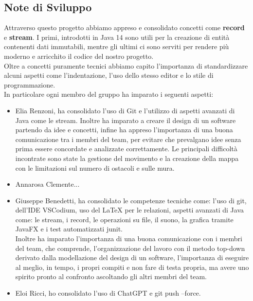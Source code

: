 \documentclass[12pt, letterpaper]{article}
\begin{document}
    \subsection{Note di Sviluppo}
        Attraverso questo progetto abbiamo appreso e consolidato concetti come \textbf{record} e \textbf{stream}. I primi, introdotti in Java 14 sono utili per la creazione di entità contenenti dati immutabili, mentre gli ultimi ci sono serviti per rendere più moderno e arricchito il codice del nostro progetto. \\
        Oltre a concetti puramente tecnici abbiamo capito l'importanza di standardizzare alcuni aspetti come l'indentazione, l'uso dello stesso editor e lo stile di programmazione.\\
        In particolare ogni membro del gruppo ha imparato i seguenti aspetti:
        \begin{itemize}
            \item Elia Renzoni, ha consolidato l'uso di Git e l'utilizzo di aspetti avanzati di Java come le stream. Inoltre ha imparato a creare il design di un software partendo da idee e concetti, infine ha appreso l'importanza di una buona comunicazione tra i membri del team, per evitare che prevalgano idee senza prima essere concordate e analizzate correttamente. Le principali difficoltà incontrate sono state la gestione del movimento e la creazione della mappa con le limitazioni sul numero di ostacoli e sulle mura.
            \item Annarosa Clemente...
            \item Giuseppe Benedetti, ha consolidato le competenze tecniche come: l'uso di git, dell'IDE VSCodium, uso del LaTeX per le relazioni, aspetti avanzati di Java come: le stream, i record, le operazioni su file, il suono, la grafica tramite JavaFX e i test automatizzati junit.\\
            Inoltre ha imparato l'importanza di una buona comunicazione con i membri del team, che comprende, l'organizzazione del lavoro con il metodo top-down derivato dalla modellazione del design di un software, l'importanza di eseguire al meglio, in tempo, i propri compiti e non fare di testa propria, ma avere uno spirito pronto al confronto ascoltando gli altri membri del team.  
            \item Eloi Ricci, ho consolidato l'uso di ChatGPT e git push --force.
        \end{itemize}
\end{document}
